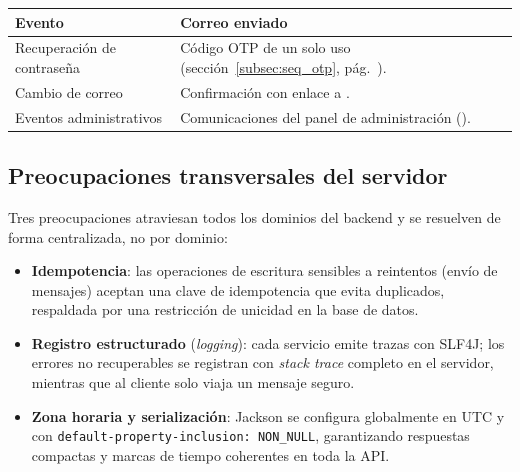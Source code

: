 \vspace{0.2cm}
\noindent
\renewcommand{\arraystretch}{1.3}
\fontsize{8.5}{10.2}\selectfont\sffamily
\begin{tabularx}{\textwidth}{|L{3.6cm}|Y|}
\hline
{}
\sffamily\textbf{Evento} & \sffamily\textbf{Correo enviado} \\
\hline
Recuperación de contraseña & Código OTP de un solo uso (sección~\ref{subsec:seq_otp}, pág.~\pageref{subsec:seq_otp}). \\ \hline
{}
Cambio de correo & Confirmación con enlace a . \\ \hline
Eventos administrativos & Comunicaciones del panel de administración (). \\ \hline
\end{tabularx}
\label{tab:emails}

\subsection{Preocupaciones transversales del servidor}
\label{subsec:transversales}

Tres preocupaciones atraviesan todos los dominios del backend y se resuelven de forma
centralizada, no por dominio:

\begin{itemize}[noitemsep]
    \item \textbf{Idempotencia}: las operaciones de escritura sensibles a reintentos (envío
    de mensajes) aceptan una clave de idempotencia que evita duplicados, respaldada por una
    restricción de unicidad en la base de datos.
    \item \textbf{Registro estructurado} (\textit{logging}): cada servicio emite trazas con
    SLF4J; los errores no recuperables se registran con \textit{stack trace} completo en el
    servidor, mientras que al cliente solo viaja un mensaje seguro.
    \item \textbf{Zona horaria y serialización}: Jackson se configura globalmente en UTC y
    con \texttt{default-property-inclusion: NON\_NULL}, garantizando respuestas compactas y
    marcas de tiempo coherentes en toda la API.
\end{itemize}
